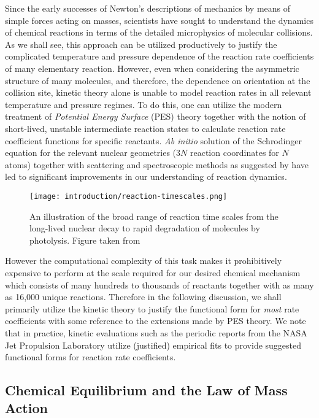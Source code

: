Since the early successes of Newton's descriptions of mechanics by means of simple forces acting on masses, scientists have sought to understand the dynamics of chemical reactions in terms of the detailed microphysics of molecular collisions. As we shall see, this approach can be utilized productively to justify the complicated temperature and pressure dependence of the reaction rate coefficients of many elementary reaction. However, even when considering the asymmetric structure of many molecules, and therefore, the dependence on orientation at the collision site, kinetic theory alone is unable to model reaction rates in all relevant temperature and pressure regimes. To do this, one can utilize the modern treatment of \textit{Potential Energy Surface} (PES) theory together with the notion of short-lived, unstable intermediate reaction states to calculate reaction rate coefficient functions for specific reactants. \textit{Ab initio} solution of the Schrodinger equation for the relevant nuclear geometries ($3N$ reaction coordinates for $N$ atoms) together with scattering and spectroscopic methods as suggested by \cite{transition-state-spectroscopy-bimol} have led to significant improvements in our understanding of reaction dynamics.



\begin{figure}[h]
  \centering
  \texttt{[image: introduction/reaction-timescales.png]}
  \caption{An illustration of the broad range of reaction time scales from the long-lived nuclear decay to rapid degradation of molecules by photolysis. Figure taken from \cite{arnaut2006chemical}}
  \label{fig:reaction-timescales}
\end{figure}


However the computational complexity of this task makes it prohibitively expensive to perform at the scale required for our desired chemical mechanism which consists of many hundreds to thousands of reactants together with as many as 16,000 unique reactions. Therefore in the following discussion, we shall primarily utilize the kinetic theory to justify the functional form for \textit{most} rate coefficients with some reference to the extensions made by PES theory. We note that in practice, kinetic evaluations such as the periodic reports from the NASA Jet Propulsion Laboratory \cite{jpl-kinetic-evaluation-2020} utilize (justified) empirical fits to provide suggested functional forms for reaction rate coefficients.

\subsection{Chemical Equilibrium and the Law of Mass Action}


